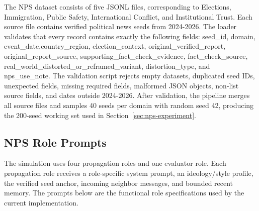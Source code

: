 The NPS dataset consists of five JSONL files, corresponding to Elections, Immigration, Public Safety, International Conflict, and Institutional Trust. Each source file contains verified political news seeds from 2024-2026. The loader validates that every record contains exactly the following fields: {seed\_id}, {domain}, {event\_date},{country\_region}, {election\_context}, {original\_verified\_report}, {original\_report\_source}, {supporting\_fact\_check\_evidence}, {fact\_check\_source}, {real\_world\_distorted\_or\_reframed\_variant}, {distortion\_type}, and {nps\_use\_note}. The validation script rejects empty datasets, duplicated seed IDs, unexpected fields, missing required fields, malformed JSON objects, non-list source fields, and dates outside 2024-2026. After validation, the pipeline merges all source files and samples 40 seeds per domain with random seed 42, producing the 200-seed working set used in Section~\ref{sec:nps-experiment}.

\subsection{NPS Role Prompts}
\label{appendix:nps-role-prompts}

The simulation uses four propagation roles and one evaluator role. Each propagation role receives a role-specific system prompt, an ideology/style profile, the verified seed anchor, incoming neighbor messages, and bounded recent memory. The prompts below are the functional role specifications used by the current implementation.





